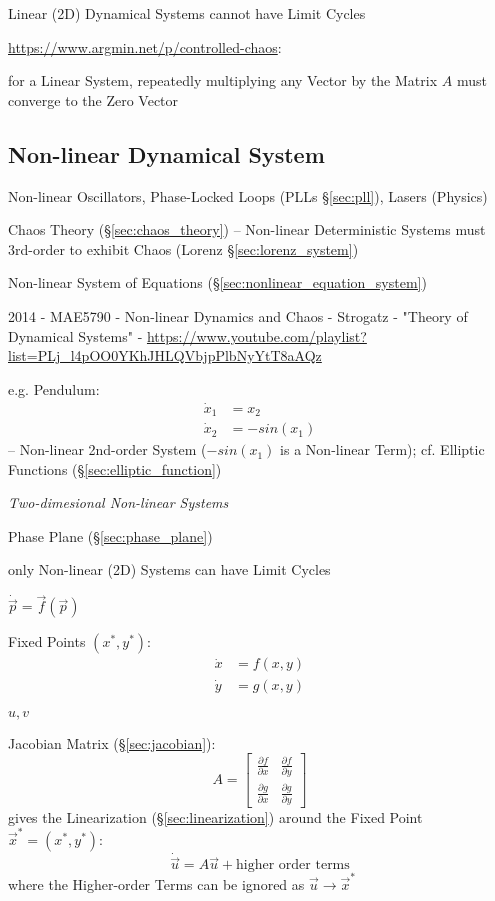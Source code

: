 Linear (2D) Dynamical Systems cannot have Limit Cycles

\url{https://www.argmin.net/p/controlled-chaos}:

for a Linear System, repeatedly multiplying any Vector by the Matrix $A$ must
converge to the Zero Vector



\subsection{Non-linear Dynamical System}\label{sec:nonlinear_dynamical_system}

Non-linear Oscillators, Phase-Locked Loops (PLLs \S\ref{sec:pll}), Lasers
(Physics)

\fist Chaos Theory (\S\ref{sec:chaos_theory}) -- Non-linear Deterministic
Systems must 3rd-order to exhibit Chaos (Lorenz \S\ref{sec:lorenz_system})

\fist Non-linear System of Equations (\S\ref{sec:nonlinear_equation_system})

2014 - MAE5790 - Non-linear Dynamics and Chaos - Strogatz - "Theory of
Dynamical Systems" -
\url{https://www.youtube.com/playlist?list=PLj_l4pOO0YKhJHLQVbjpPlbNyYtT8aAQz}

e.g. Pendulum:
\begin{align*}
  \dot{x}_1 & = x_2 \\
  \dot{x}_2 & = -sin(x_1)
\end{align*}
-- Non-linear 2nd-order System ($-sin(x_1)$ is a Non-linear Term); cf. Elliptic
Functions
(\S\ref{sec:elliptic_function})

\emph{Two-dimesional Non-linear Systems}

\fist Phase Plane (\S\ref{sec:phase_plane})

only Non-linear (2D) Systems can have Limit Cycles

$\dot{\vec{p}} = \vec{f}(\vec{p})$

Fixed Points $(x^*,y^*)$:
\begin{align*}
  \dot{x} & = f(x,y) \\
  \dot{y} & = g(x,y)
\end{align*}

$u, v$

Jacobian Matrix (\S\ref{sec:jacobian}):
\[
  A = \begin{bmatrix}
    \frac{\partial{f}}{\partial{x}} & \frac{\partial{f}}{\partial{y}} \\
    \frac{\partial{g}}{\partial{x}} & \frac{\partial{g}}{\partial{y}}
  \end{bmatrix}
\]
gives the Linearization (\S\ref{sec:linearization}) around the Fixed
Point $\vec{x}^* = (x^*, y^*)$:
\[
  \dot{\vec{u}} = A \vec{u} + \text{higher order terms}
\]
where the Higher-order Terms can be ignored as $\vec{u} \rightarrow \vec{x}^*$

